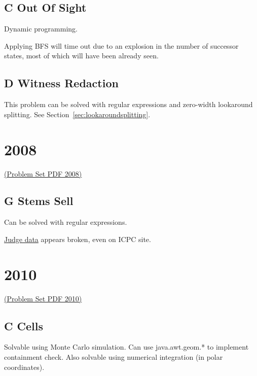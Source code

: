\subsection{C Out Of Sight}
\label{sec:2007-c-sight}

Dynamic programming.  

Applying BFS will time out due to an explosion in the number
of successor states, most of which will have been already seen.

\subsection{D Witness Redaction}
\label{sec:2007-d-witness}
This problem can be solved with regular expressions and zero-width lookaround splitting.
See Section~\ref{sec:lookaroundsplitting}.

\section{2008}
\href{http://midatl.radford.edu/docs/pastProblems/08contest/MidAtlantic2008.pdf}{(Problem Set PDF 2008)}

\subsection{G Stems Sell}
\label{sec:2008-g-stems}

Can be solved with regular expressions.

\href{http://midatl.radford.edu/docs/pastProblems/08contest/JudgingData/G-stems/}{Judge data}
appears broken, even on ICPC site.


\section{2010}
\href{http://midatl.radford.edu/docs/pastProblems/10contest/MidAtlantic2010.pdf}{(Problem Set PDF 2010)}

\subsection{C Cells}
\label{sec:2010-c-cells}

Solvable using Monte Carlo simulation.  Can use java.awt.geom.* to implement containment check.
Also solvable using numerical integration (in polar coordinates).

